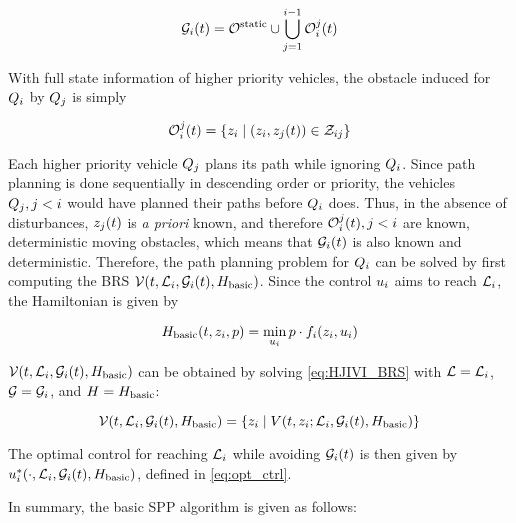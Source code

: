 \begin{equation}
\label{eq:obsseti}
\obsset_i(t)  = \soset \cup \bigcup_{j=1}^{i-1} \ioset_i^j(t)
\end{equation}

With full state information of higher priority vehicles, the obstacle induced for $Q_{i}$ by $Q_{j}$ is simply

\begin{equation}
\label{eq:ioset}
\ioset_i^j(t) = \{\state_i \mid (\state_i, \state_j(t)) \in \dz_{ij}\}
\end{equation}

Each higher priority vehicle $Q_{j}$ plans its path while ignoring $Q_{i}$. Since path planning is done sequentially in descending order or priority, the vehicles $Q_{j}, j<i$ would have planned their paths before $Q_{i}$ does. Thus, in the absence of disturbances, $z_j(t)$ is \textit{a priori} known, and therefore $\mathcal{O}_i^j(t), j<i$ are known, deterministic moving obstacles, which means that $\mathcal{G}_i(t)$ is also known and deterministic. Therefore, the path planning problem for $Q_{i}$ can be solved by first computing the BRS $\mathcal{V}(t, \mathcal{L}_i, \mathcal{G}_i(t), H_\text{basic})$. Since the control $u_i$ aims to reach $\mathcal{L}_i$, the Hamiltonian is given by

\begin{equation}
\label{eq:basicham}
\basicham(t, \state_i, p) = \min_{\ctrl_i} p \cdot \fdyn_i(\state_i, \ctrl_i)
\end{equation}

$\mathcal{V}(t, \mathcal{L}_i, \mathcal{G}_i(t), H_\text{basic})$ can be obtained by solving \eqref{eq:HJIVI_BRS} with $\mathcal{L} = \mathcal{L}_i$, $\mathcal{G} = \mathcal{G}_i$, and $H=H_\text{basic}$: 

\begin{equation}
\mathcal{V}(t, \mathcal{L}_i, \mathcal{G}_i(t), H_\text{basic}) = \{z_i \mid V(t, z_i;  \mathcal{L}_i, \mathcal{G}_i(t), H_\text{basic})\}
\end{equation}

The optimal control for reaching $\mathcal{L}_i$ while avoiding $\mathcal{G}_i(t)$ is then given by $u_i^*(\cdot, \mathcal{L}_i, \mathcal{G}_i(t), H_\text{basic})$, defined in \eqref{eq:opt_ctrl}.

In summary, the basic SPP algorithm is given as follows:

